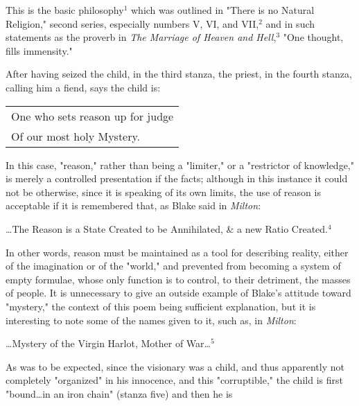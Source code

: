 This is the basic philosophy$^{1}$ which was outlined in "There is no Natural Religion," second series,
especially numbers V, VI, and VII,$^{2}$ and in such statements as the proverb in \textit{The Marriage of Heaven and Hell},$^{3}$
"One thought, fills immensity."\par
\vspace*{0.5\baselineskip}
After having seized the child, in the third stanza, the priest, in the fourth stanza, calling him a fiend,
says the child is:\par
\begin{center}
	\begin{tabular}{l}
		One who sets reason up for judge \\
		Of our most holy Mystery.
	\end{tabular}
\end{center}
\hspace*{5mm}In this case, "reason," rather than being a "limiter," or a "restrictor of knowledge," is merely a controlled presentation
if the facts; although in this instance it could not be otherwise, since it is speaking of its own limits, the use of reason is
acceptable if it is remembered that, as Blake said in \textit{Milton}:\par
\begin{center}
	\parbox{0.8\textwidth}{
		\centering
		\dots The Reason is a State Created to be Annihilated, \& a new Ratio Created.$^{4}$
	}%
\end{center}
\hspace*{5mm}In other words, reason must be maintained as a tool for describing reality, either of the imagination or of the "world," and
prevented from becoming a system of empty formulae, whose only function is to control, to their detriment, the masses of people.
It is unnecessary to give an outside example of Blake's attitude toward "mystery," the context of this poem being sufficient explanation,
but it is interesting to note some of the names given to it, such as, in \textit{Milton}:\par
\begin{center}
	\parbox{0.8\textwidth}{
		\centering
		\dots Mystery of the Virgin Harlot, Mother of War\dots$^{5}$
	}%
\end{center}
\hspace*{5mm}As was to be expected, since the visionary was a child, and thus apparently not completely "organized" in his
innocence, and this "corruptible," the child is first "bound\dots in an iron chain" (stanza five) and then he is
